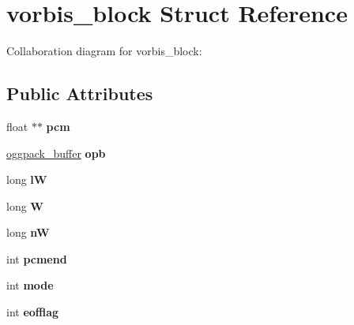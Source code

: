 \hypertarget{structvorbis__block}{\section{vorbis\+\_\+block Struct Reference}
\label{structvorbis__block}
}


Collaboration diagram for vorbis\+\_\+block\+:
\subsection*{Public Attributes}
\begin{DoxyCompactItemize}
\item 
\hypertarget{structvorbis__block_ac8312d70a6e63afc01d3df8a54ac6508}{float $\ast$$\ast$ {\bfseries pcm}}\label{structvorbis__block_ac8312d70a6e63afc01d3df8a54ac6508}

\item 
\hypertarget{structvorbis__block_a43f1746974a729fa4e835ef995f9782a}{\hyperlink{structoggpack__buffer}{oggpack\+\_\+buffer} {\bfseries opb}}\label{structvorbis__block_a43f1746974a729fa4e835ef995f9782a}

\item 
\hypertarget{structvorbis__block_a97675088561ed9aa4559e869aafd1f2c}{long {\bfseries l\+W}}\label{structvorbis__block_a97675088561ed9aa4559e869aafd1f2c}

\item 
\hypertarget{structvorbis__block_a1e420440dd6a5a39262c0fe7afa8435a}{long {\bfseries W}}\label{structvorbis__block_a1e420440dd6a5a39262c0fe7afa8435a}

\item 
\hypertarget{structvorbis__block_a6fa002c8c36ad39c1c015cfa673dda28}{long {\bfseries n\+W}}\label{structvorbis__block_a6fa002c8c36ad39c1c015cfa673dda28}

\item 
\hypertarget{structvorbis__block_a946562a7fdb80cabf6ee749bdce1a0ed}{int {\bfseries pcmend}}\label{structvorbis__block_a946562a7fdb80cabf6ee749bdce1a0ed}

\item 
\hypertarget{structvorbis__block_adab44bb8520c9d5daafee3f1a1bcf538}{int {\bfseries mode}}\label{structvorbis__block_adab44bb8520c9d5daafee3f1a1bcf538}

\item 
\hypertarget{structvorbis__block_a7bc1252bc17a2cd1ee2a4154fdd2617b}{int {\bfseries eofflag}}\label{structvorbis__block_a7bc1252bc17a2cd1ee2a4154fdd2617b}


\end{DoxyCompactItemize}
